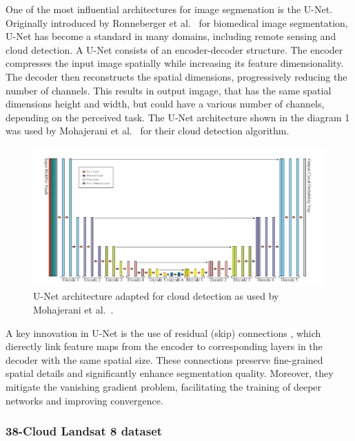 {One of the most influential architectures for image segmenation is the U-Net. Originally introduced by Ronneberger et al.~\cite{ronneberger2015u} for biomedical image segmentation, U-Net has become a standard in many domains, including remote sensing and cloud detection. A U-Net consists of an encoder-decoder structure. The encoder compresses the input image spatially while increasing its feature dimensionality. The decoder then reconstructs the spatial dimensions, progressively reducing the number of channels. This results in output imgage, that has the same spatial dimensions height and width, but could have a various number of channels, depending on the perceived task. The U-Net architecture shown in the diagram 1 was used by Mohajerani et al.~\cite{mohajerani2019cloudnet}  for their cloud detection algorithm.

\begin{figure}[H]
  \centering
  \includegraphics[width=\textwidth]{files/U-Net_cloud_detection.png}
  \caption{U-Net architecture adapted for cloud detection as used by Mohajerani et al.~\cite{mohajerani2019cloudnet}.}
  \label{fig:unet-architecture}
\end{figure}


A key innovation in U-Net is the use of residual (skip) connections \cite{he2015deepresiduallearningimage}, which dierectly link feature maps from the encoder to corresponding layers in the decoder with the same spatial size. These connections preserve fine-grained spatial details and significantly enhance segmentation quality. Moreover, they mitigate the vanishing gradient problem, facilitating the training of deeper networks and improving convergence.

\subsubsection{38-Cloud Landsat 8 dataset}

}
